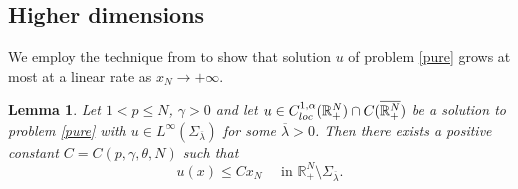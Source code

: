 \documentclass[reqno]{amsart}
\theoremstyle{plain}
\newtheorem{lemma}[theorem]{Lemma}
\theoremstyle{definition}
\theoremstyle{remark}
\begin{document}
	\subsection{Higher dimensions}
	We employ the technique from \cite[Proposition 5]{MR4753083} to show that solution $u$ of problem \eqref{pure} grows at most at a linear rate as $x_N \to +\infty$.
	\begin{lemma}\label{lem:upper_bound_infty}
		Let $1<p\le N$, $\gamma>0$ and let $u \in C^{1,\alpha}_{\rm loc}(\mathbb{R}^N_+) \cap C(\overline{\mathbb{R}^N_+})$ be a solution to problem \eqref{pure} with $u\in L^\infty(\Sigma_{\overline\lambda})$ for some $\overline\lambda>0$.
		Then there exists a positive constant $C = C(p, \gamma, \theta, N)$ such that
		\[
		u(x) \le C x_N \quad\text{ in } \mathbb{R}^N_+\setminus\Sigma_{\overline{\lambda}}.
		\]
	\end{lemma}
\end{document}
